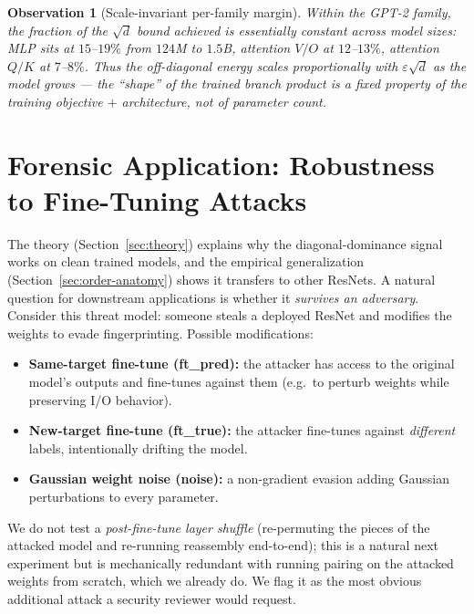 \documentclass[10pt]{article}
\newtheorem{observation}{Observation}
\theoremstyle{remark}
\begin{document}
\begin{observation}[Scale-invariant per-family margin]\label{obs:scale-invariant}
Within the GPT-2 family, the fraction of the $\sqrt{d}$ bound
achieved is essentially constant across model sizes: MLP sits at
$15$--$19\%$ from $124$M to $1.5$B, attention $V/O$ at
$12$--$13\%$, attention $Q/K$ at $7$--$8\%$. Thus the off-diagonal
energy scales proportionally with $\varepsilon\sqrt{d}$ as the model
grows --- the ``shape'' of the trained branch product is a fixed
property of the training objective $+$ architecture, not of parameter
count.
\end{observation}

\section{Forensic Application: Robustness to Fine-Tuning Attacks}\label{sec:attack}

The theory (Section~\ref{sec:theory}) explains why the
diagonal-dominance signal works on clean trained models, and the
empirical generalization (Section~\ref{sec:order-anatomy}) shows it
transfers to other ResNets. A natural question for downstream
applications is whether it \emph{survives an adversary}. Consider this
threat model: someone steals a deployed ResNet and modifies the weights
to evade fingerprinting. Possible modifications:
\begin{itemize}[leftmargin=*,itemsep=0pt]
  \item \textbf{Same-target fine-tune (ft\_pred):} the attacker has access
        to the original model's outputs and fine-tunes against them
        (e.g.\ to perturb weights while preserving I/O behavior).
  \item \textbf{New-target fine-tune (ft\_true):} the attacker fine-tunes
        against \emph{different} labels, intentionally drifting the model.
  \item \textbf{Gaussian weight noise (noise):} a non-gradient evasion
        adding Gaussian perturbations to every parameter.
\end{itemize}
We do not test a \emph{post-fine-tune layer shuffle} (re-permuting the
pieces of the attacked model and re-running reassembly end-to-end);
this is a natural next experiment but is mechanically redundant with
running pairing on the attacked weights from scratch, which we already do.
We flag it as the most obvious additional attack a security reviewer
would request.
\end{document}
